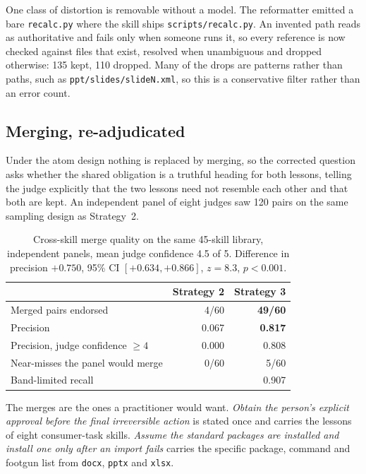 \documentclass[11pt]{article}
\begin{document}
One class of distortion is removable without a model. The reformatter emitted a bare
\texttt{recalc.py} where the skill ships \texttt{scripts/recalc.py}. An invented path reads as
authoritative and fails only when someone runs it, so every reference is now checked against files
that exist, resolved when unambiguous and dropped otherwise: 135 kept, 110 dropped. Many of the
drops are patterns rather than paths, such as \texttt{ppt/slides/slideN.xml}, so this is a
conservative filter rather than an error count.

\subsection{Merging, re-adjudicated}

Under the atom design nothing is replaced by merging, so the corrected question asks whether the
shared obligation is a truthful heading for both lessons, telling the judge explicitly that the two
lessons need not resemble each other and that both are kept. An independent panel of eight judges
saw 120 pairs on the same sampling design as Strategy~2.

\begin{table}[h]\centering\small
\begin{tabular}{lrr}
\toprule
& Strategy 2 & Strategy 3 \\
\midrule
Merged pairs endorsed & 4/60 & \textbf{49/60} \\
Precision & 0.067 & \textbf{0.817} \\
Precision, judge confidence $\geq 4$ & 0.000 & 0.808 \\
Near-misses the panel would merge & 0/60 & 5/60 \\
Band-limited recall & & 0.907 \\
\bottomrule
\end{tabular}
\caption{Cross-skill merge quality on the same 45-skill library, independent panels, mean judge
confidence 4.5 of 5. Difference in precision $+0.750$, 95\% CI $[+0.634, +0.866]$, $z = 8.3$,
$p < 0.001$.}
\label{tab:s3adj}
\end{table}

The merges are the ones a practitioner would want. \emph{Obtain the person's explicit approval
before the final irreversible action} is stated once and carries the lessons of eight consumer-task
skills. \emph{Assume the standard packages are installed and install one only after an import fails}
carries the specific package, command and footgun list from \texttt{docx}, \texttt{pptx} and
\texttt{xlsx}.
\end{document}
